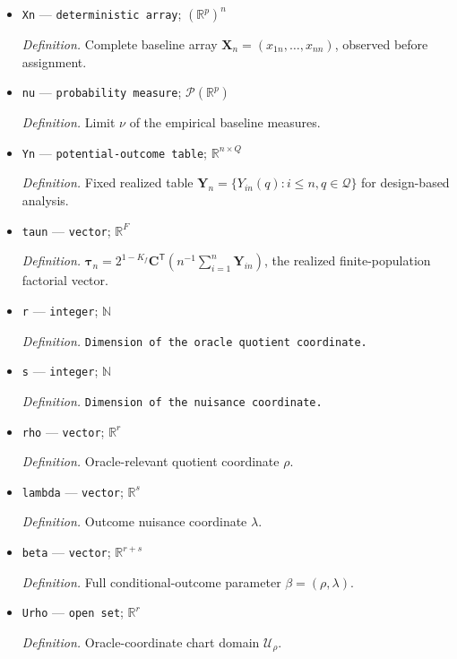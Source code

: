 \documentclass{article}
\begin{document}
\begin{itemize}
  \item \texttt{Xn} --- \texttt{deterministic array}; \((\mathbb R^{p})^{n}\)
  \par\smallskip\noindent\emph{Definition.} Complete baseline array \(\mathbf X_n=(x_{1n},\ldots,x_{nn})\), observed before assignment.
  \item \texttt{nu} --- \texttt{probability measure}; \(\mathcal P(\mathbb R^{p})\)
  \par\smallskip\noindent\emph{Definition.} Limit \(\nu\) of the empirical baseline measures.
  \item \texttt{Yn} --- \texttt{potential-\allowbreak{}outcome table}; \(\mathbb R^{n\times Q}\)
  \par\smallskip\noindent\emph{Definition.} Fixed realized table \(\mathbf Y_n=\{Y_{in}(q):i\le n,q\in\mathcal Q\}\) for design-based analysis.
  \item \texttt{taun} --- \texttt{vector}; \(\mathbb R^{F}\)
  \par\smallskip\noindent\emph{Definition.} \(\boldsymbol\tau_n=2^{1-K_f}\mathbf C^{\mathsf T}(n^{-1}\sum_{i=1}^{n}\mathbf Y_{in})\), the realized finite-population factorial vector.
  \item \texttt{r} --- \texttt{integer}; \(\mathbb N\)
  \par\smallskip\noindent\emph{Definition.} \texttt{Dimension of the oracle quotient coordinate.}
  \item \texttt{s} --- \texttt{integer}; \(\mathbb N\)
  \par\smallskip\noindent\emph{Definition.} \texttt{Dimension of the nuisance coordinate.}
  \item \texttt{rho} --- \texttt{vector}; \(\mathbb R^{r}\)
  \par\smallskip\noindent\emph{Definition.} Oracle-relevant quotient coordinate \(\rho\).
  \item \texttt{lambda} --- \texttt{vector}; \(\mathbb R^{s}\)
  \par\smallskip\noindent\emph{Definition.} Outcome nuisance coordinate \(\lambda\).
  \item \texttt{beta} --- \texttt{vector}; \(\mathbb R^{r+s}\)
  \par\smallskip\noindent\emph{Definition.} Full conditional-outcome parameter \(\beta=(\rho,\lambda)\).
  \item \texttt{Urho} --- \texttt{open set}; \(\mathbb R^{r}\)
  \par\smallskip\noindent\emph{Definition.} Oracle-coordinate chart domain \(\mathcal U_{\rho}\).

\end{itemize}
\end{document}
